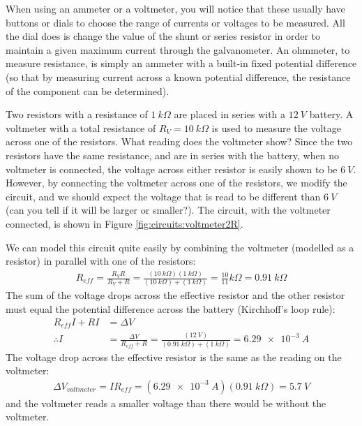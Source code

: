 When using an ammeter or a voltmeter, you will notice that these usually have buttons or dials to choose the range of currents or voltages to be measured. All the dial does is change the value of the shunt or series resistor in order to maintain a given maximum current through the galvanometer. An ohmmeter, to measure resistance, is simply an ammeter with a built-in fixed potential difference (so that by measuring current across a known potential difference, the resistance of the component can be determined). 
\vspace{-0.25cm}
\newpage
\begin{example}{Two resistors with a resistance of $\SI{1}{k\Omega}$ are placed in series with a $\SI{12}{V}$ battery. A voltmeter with a total resistance of $R_V=\SI{10}{k\Omega}$ is used to measure the voltage across one of the resistors. What reading does the voltmeter show?}
Since the two resistors have the same resistance, and are in series with the battery, when no voltmeter is connected, the voltage across either resistor is easily shown to be $\SI{6}{V}$. However, by connecting the voltmeter across one of the resistors, we modify the circuit, and we should expect the voltage that is read to be different than $\SI{6}{V}$ (can you tell if it will be larger or smaller?). The circuit, with the voltmeter connected, is shown in Figure \ref{fig:circuits:voltmeter2R}.


We can model this circuit quite easily by combining the voltmeter (modelled as a resistor) in parallel with one of the resistors:
\begin{align*}
R_{eff}=\frac{R_VR}{R_V+R}=\frac{(\SI{10}{k\Omega})(\SI{1}{k\Omega})}{(\SI{10}{k\Omega})+(\SI{1}{k\Omega})}=\frac{10}{11}\si{k\Omega}=\SI{0.91}{k\Omega}
\end{align*}
The sum of the voltage drops across the effective resistor and the other resistor must equal the potential difference across the battery (Kirchhoff's loop rule):
\begin{align*}
R_{eff}I+RI&=\Delta V\\
\therefore I &= \frac{\Delta V}{R_{eff}+R}=\frac{(\SI{12}{V})}{(\SI{0.91}{k\Omega})+(\SI{1}{k\Omega})}=\SI{6.29e-3}{A}
\end{align*}
The voltage drop across the effective resistor is the same as the reading on the voltmeter:
\begin{align*}
\Delta V_{voltmeter}=IR_{eff}=(\SI{6.29e-3}{A})(\SI{0.91}{k\Omega})=\SI{5.7}{V}
\end{align*}
and the voltmeter reads a smaller voltage than there would be without the voltmeter.


\end{example}
